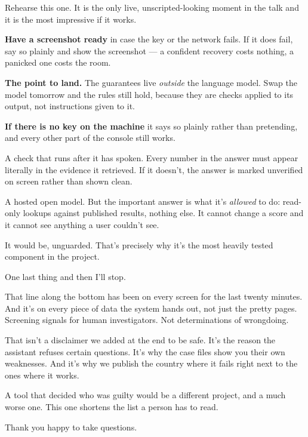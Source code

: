 \documentclass[11pt]{article}
\begin{document}
\begin{means}
Rehearse this one. It is the only live, unscripted-looking moment in the talk
and it is the most impressive if it works.

\textbf{Have a screenshot ready} in case the key or the network fails. If it
does fail, say so plainly and show the screenshot --- a confident recovery
costs nothing, a panicked one costs the room.

\textbf{The point to land.} The guarantees live \emph{outside} the language
model. Swap the model tomorrow and the rules still hold, because they are
checks applied to its output, not instructions given to it.

\textbf{If there is no key on the machine} it says so plainly rather than
pretending, and every other part of the console still works.
\end{means}

\begin{asked}
 A check that runs after it has spoken.
Every number in the answer must appear literally in the evidence it retrieved.
If it doesn't, the answer is marked unverified on screen rather than shown
clean.

 A hosted open model. But the important answer is
what it's \emph{allowed} to do: read-only lookups against published results,
nothing else. It cannot change a score and it cannot see anything a user
couldn't see.

 It would be,
unguarded. That's precisely why it's the most heavily tested component in the
project.
\end{asked}


\begin{saythis}
One last thing and then I'll stop.

That line along the bottom has been on every screen for the last twenty
minutes. And it's on every piece of data the system hands out, not just the
pretty pages. Screening signals for human investigators. Not determinations of
wrongdoing.

That isn't a disclaimer we added at the end to be safe. It's the reason the
assistant refuses certain questions. It's why the case files show you their own
weaknesses. And it's why we publish the country where it fails right next to
the ones where it works.

A tool that decided who was guilty would be a different project, and a much
worse one. This one shortens the list a person has to read.

Thank you \bt happy to take questions.
\end{saythis}
\end{document}
